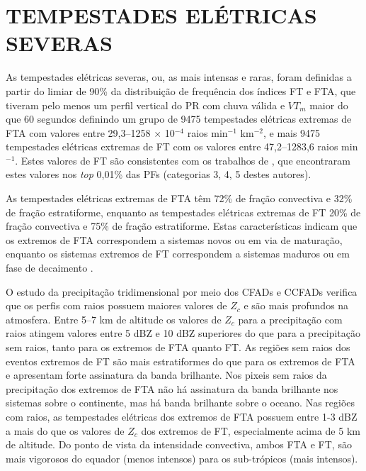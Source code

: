 \section{TEMPESTADES ELÉTRICAS SEVERAS}

As tempestades elétricas severas, ou, as mais intensas e raras, foram definidas a partir do limiar de 90\% da distribuição de frequência dos índices FT e FTA, que tiveram pelo menos um perfil vertical do PR com chuva válida e $VT_m$ maior do que 60 segundos  definindo um grupo de 9475 tempestades elétricas extremas de FTA com valores entre 29,3--1258 $\times$ 10$^{-4}$ raios min$^{-1}$ km$^{-2}$, e mais 9475 tempestades elétricas extremas de FT com os valores entre 47,2--1283,6 raios min$^{-1}$.  Estes valores de FT são consistentes com os trabalhos de , que encontraram estes valores nos \textit{top} 0,01\% das PFs (categorias 3, 4, 5 destes autores).


As tempestades elétricas extremas de FTA têm 72\% de fração convectiva e 32\% de fração estratiforme, enquanto as tempestades elétricas extremas de FT 20\% de fração convectiva e 75\% de fração estratiforme. Estas características indicam que os extremos de FTA correspondem a sistemas novos ou em via de maturação, enquanto os sistemas extremos de FT correspondem a sistemas maduros ou em fase de decaimento \cite{learyHouse1979}. 

O estudo da precipitação tridimensional por meio dos CFADs e CCFADs verifica que os perfis com raios possuem maiores valores de  $Z_c$ e são mais profundos na atmosfera. Entre 5--7 km de altitude os valores de $Z_c$ para a precipitação com raios atingem valores entre 5 dBZ e 10 dBZ superiores do que para a precipitação sem raios, tanto para os extremos de FTA quanto FT. As regiões sem raios dos eventos extremos de FT são mais estratiformes do que para os extremos de FTA e apresentam forte assinatura da banda brilhante. Nos pixeis sem raios da precipitação dos extremos de FTA não há assinatura da banda brilhante nos sistemas sobre o continente, mas há banda brilhante sobre o oceano. Nas regiões com raios, as tempestades elétricas dos extremos de FTA possuem entre 1-3 dBZ a mais do que os valores de $Z_c$ dos extremos de FT, especialmente acima de 5 km de altitude. Do ponto de vista da intensidade convectiva, ambos FTA e FT, são mais vigorosos do equador (menos intensos) para os sub-trópicos (mais intensos). 


